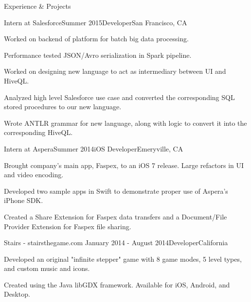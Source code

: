 \documentclass{resume} %
\begin{document}

\begin{rSection}{Experience \& Projects}

    \begin{rSubsection}{Intern at Salesforce}{Summer 2015}{Developer}{San Francisco, CA}
\item Worked on backend of platform for batch big data processing.
\item Performance tested JSON/Avro serialization in Spark pipeline.
\item Worked on designing new language to act as intermediary between UI and HiveQL.
\item Analyzed high level Salesforce use case and converted the corresponding SQL stored procedures to
    our new language.
\item Wrote ANTLR grammar for new language, along with logic to convert it into the corresponding HiveQL.
\end{rSubsection}


\begin{rSubsection}{Intern at Aspera}{Summer 2014}{iOS Developer}{Emeryville, CA}
\item Brought company's main app, Faspex, to an iOS 7 release. Large refactors in
    UI and video encoding.
\item Developed two sample apps in Swift to demonstrate proper use of Aspera's iPhone
    SDK.
\item Created a Share Extension for Faspex data transfers and a Document/File Provider Extension
    for Faspex file sharing.
\end{rSubsection}


\begin{rSubsection}{Stairs - stairsthegame.com }{January 2014 - August 2014}{Developer}{California}
\item Developed an original "infinite stepper" game with 8 game modes,
    5 level types, and custom music and icons.
\item Created using the Java libGDX framework. Available for iOS, Android, and Desktop.
\end{rSubsection}


\end{rSection}
\end{document}
